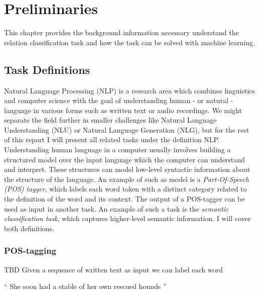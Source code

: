 
\chapter{Preliminaries}

This chapter provides the background information necessary understand the relation classification task and how the task can be solved with machine learning. 

\section{Task Definitions}

Natural Language Processing (NLP) is a research area which combines linguistics and computer science with the 
goal of understanding human - or natural - language in various forms such as written text or audio recordings. We might separate the field further in smaller challenges like Natural Language Understanding (NLU) or Natural Language Generation (NLG), but for the rest of this report I will present all related tasks under the definition NLP.\\

Understanding human language in a computer usually involves building a structured model over the input language which the computer can understand and interpret. These structures can model low-level syntactic information about the structure of the language. An example of such as model is a \emph{Part-Of-Speech (POS) tagger}, which labels each word token with a distinct category related to the definition of the word and its context. The output of a POS-tagger can be used as input in another task. An example of such a task is the \emph{semantic classification task}, which captures higher-level semantic information. I will cover both definitions.

\subsection{POS-tagging}
\label{pos-tagging}
TBD
Given a sequence of written text as input we can label each word 

\begin{center}
`` She soon had a stable of her own rescued hounds ''
\end{center}


